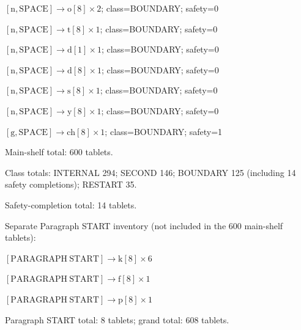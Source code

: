 \(\left[\mathrm{n}, \mathrm{SPACE}\right] \to \mathrm{o}[8] \times 2\); class=BOUNDARY; safety=0\par
\(\left[\mathrm{n}, \mathrm{SPACE}\right] \to \mathrm{t}[8] \times 1\); class=BOUNDARY; safety=0\par
\(\left[\mathrm{n}, \mathrm{SPACE}\right] \to \mathrm{d}[1] \times 1\); class=BOUNDARY; safety=0\par
\(\left[\mathrm{n}, \mathrm{SPACE}\right] \to \mathrm{d}[8] \times 1\); class=BOUNDARY; safety=0\par
\(\left[\mathrm{n}, \mathrm{SPACE}\right] \to \mathrm{s}[8] \times 1\); class=BOUNDARY; safety=0\par
\(\left[\mathrm{n}, \mathrm{SPACE}\right] \to \mathrm{y}[8] \times 1\); class=BOUNDARY; safety=0\par
\(\left[\mathrm{g}, \mathrm{SPACE}\right] \to \mathrm{ch}[8] \times 1\); class=BOUNDARY; safety=1\par
\par
Main-shelf total: 600 tablets.\par
Class totals: INTERNAL 294; SECOND 146; BOUNDARY 125 (including 14 safety completions); RESTART 35.\par
Safety-completion total: 14 tablets.\par
\par
Separate Paragraph START inventory (not included in the 600 main-shelf tablets):\par
\(\left[\mathrm{PARAGRAPH\ START}\right] \to \mathrm{k}[8] \times 6\)\par
\(\left[\mathrm{PARAGRAPH\ START}\right] \to \mathrm{f}[8] \times 1\)\par
\(\left[\mathrm{PARAGRAPH\ START}\right] \to \mathrm{p}[8] \times 1\)\par
Paragraph START total: 8 tablets; grand total: 608 tablets.\par
